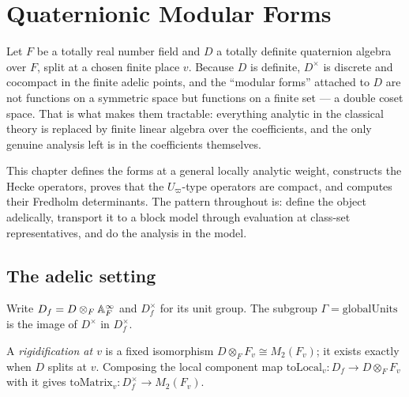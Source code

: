 \chapter{Quaternionic Modular Forms}
\label{chap:qmf}

Let $F$ be a totally real number field and $D$ a totally definite quaternion algebra over $F$,
split at a chosen finite place $v$.  Because $D$ is definite, $D^\times$ is discrete and
cocompact in the finite adelic points, and the ``modular forms'' attached to $D$ are not
functions on a symmetric space but functions on a finite set --- a double coset space.  That is
what makes them tractable: everything analytic in the classical theory is replaced by finite
linear algebra over the coefficients, and the only genuine analysis left is in the coefficients
themselves.

This chapter defines the forms at a general locally analytic weight, constructs the Hecke
operators, proves that the $U_\varpi$-type operators are compact, and computes their Fredholm
determinants.  The pattern throughout is: define the object adelically, transport it to a block
model through evaluation at class-set representatives, and do the analysis in the model.

\section{The adelic setting}

\begin{definition}
  \label{def:dfx}
  \leanok
  Write $D_f = D \otimes_F \mathbb{A}_F^\infty$ and $D_f^\times$ for its unit group.  The subgroup
  $\Gamma = \mathrm{globalUnits}$ is the image of $D^\times$ in $D_f^\times$.
\end{definition}

\begin{definition}
  \label{def:rigidification}
  \leanok
  A \emph{rigidification at $v$} is a fixed isomorphism $D \otimes_F F_v \cong M_2(F_v)$; it
  exists exactly when $D$ splits at $v$.  Composing the local component map $\mathrm{toLocal}_v :
  D_f \to D \otimes_F F_v$ with it gives $\mathrm{toMatrix}_v : D_f^\times \to M_2(F_v)$.
\end{definition}

